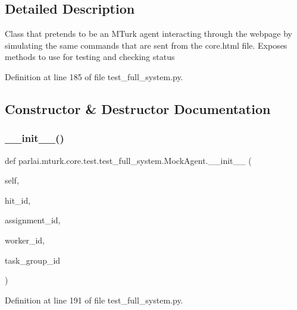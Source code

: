 \subsection{Detailed Description}
\begin{DoxyVerb}Class that pretends to be an MTurk agent interacting through the
webpage by simulating the same commands that are sent from the core.html
file. Exposes methods to use for testing and checking status
\end{DoxyVerb}
 

Definition at line 185 of file test\+\_\+full\+\_\+system.\+py.



\subsection{Constructor \& Destructor Documentation}
\mbox{\label{classparlai_1_1mturk_1_1core_1_1test_1_1test__full__system_1_1MockAgent_a68f39f241ca2ab60cc7bb93b282e84d7}} 
\subsubsection{\texorpdfstring{\+\_\+\+\_\+init\+\_\+\+\_\+()}{\_\_init\_\_()}}
{\footnotesize\ttfamily def parlai.\+mturk.\+core.\+test.\+test\+\_\+full\+\_\+system.\+Mock\+Agent.\+\_\+\+\_\+init\+\_\+\+\_\+ (\begin{DoxyParamCaption}\item[{}]{self,  }\item[{}]{hit\+\_\+id,  }\item[{}]{assignment\+\_\+id,  }\item[{}]{worker\+\_\+id,  }\item[{}]{task\+\_\+group\+\_\+id }\end{DoxyParamCaption})}



Definition at line 191 of file test\+\_\+full\+\_\+system.\+py.



